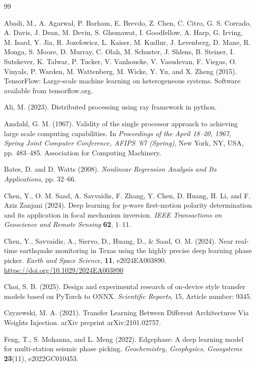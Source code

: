 \begin{thebibliography}{99}
\sloppy

Abadi, M., A. Agarwal, P. Barham, E. Brevdo, Z. Chen, C. Citro, G. S. Corrado, A. Davis, J. Dean, M. Devin, S. Ghemawat, I. Goodfellow, A. Harp, G. Irving, M. Isard, Y. Jia, R. Jozefowicz, L. Kaiser, M. Kudlur, J. Levenberg, D. Mane, R. Monga, S. Moore, D. Murray, C. Olah, M. Schuster, J. Shlens, B. Steiner, I. Sutskever, K. Talwar, P. Tucker, V. Vanhoucke, V. Vasudevan, F. Viegas, O. Vinyals, P. Warden, M. Wattenberg, M. Wicke, Y. Yu, and X. Zheng (2015). TensorFlow: Large-scale machine learning on heterogeneous systems. Software available from tensorflow.org.

Ali, M. (2023). Distributed processing using ray framework in python.

Amdahl, G. M. (1967). Validity of the single processor approach to achieving large scale computing capabilities. In \textit{Proceedings of the April 18--20, 1967, Spring Joint Computer Conference, AFIPS '67 (Spring)}, New York, NY, USA, pp. 483--485. Association for Computing Machinery.

Bates, D. and D. Watts (2008). \textit{Nonlinear Regression Analysis and Its Applications}, pp. 32--66.

Chen, Y., O. M. Saad, A. Savvaidis, F. Zhang, Y. Chen, D. Huang, H. Li, and F. Aziz Zanjani (2024). Deep learning for p-wave first-motion polarity determination and its application in focal mechanism inversion. \textit{IEEE Transactions on Geoscience and Remote Sensing} \textbf{62}, 1--11.

Chen, Y., Savvaidis, A., Siervo, D., Huang, D., \& Saad, O. M. (2024). Near real-time earthquake monitoring in Texas using the highly precise deep learning phase picker. \textit{Earth and Space Science}, \textbf{11}, e2024EA003890. \url{https://doi.org/10.1029/2024EA003890}

Choi, S. B. (2025). Design and experimental research of on-device style transfer models based on PyTorch to ONNX. \textit{Scientific Reports}, 15, Article number: 9345.

Czyzewski, M. A. (2021). Transfer Learning Between Different Architectures Via Weights Injection. arXiv preprint arXiv:2101.02757.

Feng, T., S. Mohanna, and L. Meng (2022). Edgephase: A deep learning model for multi-station seismic phase picking. \textit{Geochemistry, Geophysics, Geosystems} \textbf{23}(11), e2022GC010453.


\end{thebibliography}
